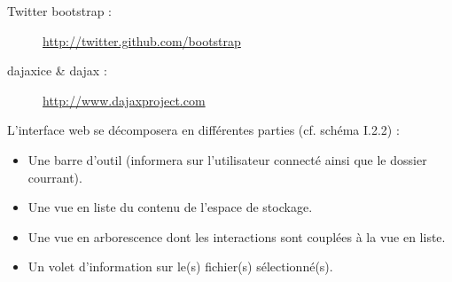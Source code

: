 \begin{description}
     \item[Twitter bootstrap :] \url{http://twitter.github.com/bootstrap}
     \item[dajaxice \& dajax :] \url{http://www.dajaxproject.com}
\end{description}


L'interface web se décomposera en différentes parties (cf. schéma I.2.2) :

\begin{itemize}
     \item Une barre d'outil (informera sur l'utilisateur connecté ainsi que le dossier courrant).
     \item Une vue en liste du contenu de l'espace de stockage.
     \item Une vue en arborescence dont les interactions sont couplées à la vue en liste.
     \item Un volet d'information sur le(s) fichier(s) sélectionné(s).
\end{itemize}
